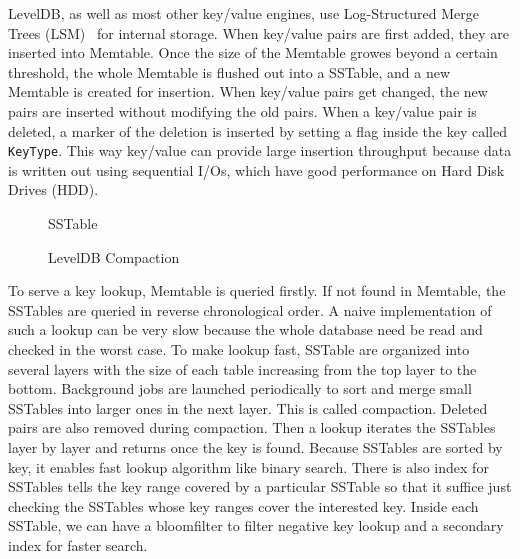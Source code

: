 LevelDB, as well as most other key/value engines, use Log-Structured
Merge Trees (LSM)~\cite{lsm} for internal storage. When key/value
pairs are first added, they are inserted into Memtable.  Once the size
of the Memtable growes beyond a certain threshold, the whole Memtable
is flushed out into a SSTable, and a new Memtable is created for
insertion. When key/value pairs get changed, the new pairs are
inserted without modifying the old pairs. When a key/value pair is
deleted, a marker of the deletion is inserted by setting a flag inside
the key called \texttt{KeyType}. This way key/value can provide large
insertion throughput because data is written out using sequential
I/Os, which have good performance on Hard Disk Drives (HDD). 

\begin{figure}[t]
\begin{centering}
\caption{SSTable}
\label{fig:sstable}
\end{centering}
\end{figure}

\begin{figure}[t]
\begin{centering}
\caption{LevelDB Compaction}
\label{fig:compact}
\end{centering}
\end{figure}

To serve a key lookup, Memtable is queried firstly. If not found in
Memtable, the SSTables are queried in reverse chronological order. A
naive implementation of such a lookup can be very slow because the
whole database need be read and checked in the worst case. To make
lookup fast, SSTable are organized into several layers with the size
of each table increasing from the top layer to the bottom. Background
jobs are launched periodically to sort and merge small SSTables into
larger ones in the next layer. This is called compaction. Deleted
pairs are also removed during compaction. Then a lookup iterates the
SSTables layer by layer and returns once the key is found.  Because
SSTables are sorted by key, it enables fast lookup algorithm like
binary search. There is also index for SSTables tells the key range
covered by a particular SSTable so that it suffice just checking the
SSTables whose key ranges cover the interested key. Inside each
SSTable, we can have a bloomfilter to filter negative key lookup and a
secondary index for faster search.

